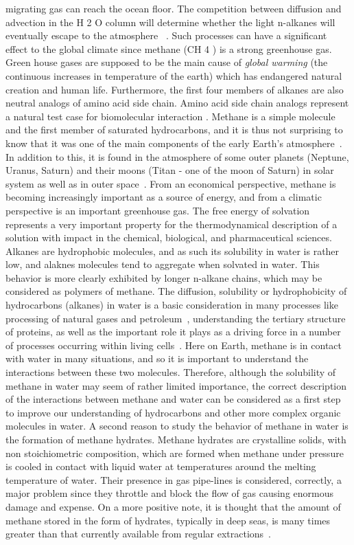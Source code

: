 \begin{sloppypar}
migrating gas can reach the ocean floor. The competition between diffusion and  advection  in the H 2 O column will determine whether the light n-alkanes will eventually escape to the atmosphere ~\citep{mcginnis2006}. Such processes can have a significant effect to the global climate since methane (CH 4 ) is a strong greenhouse gas. Green house gases are supposed to be the main cause of {\it global warming} (the continuous increases in temperature of the earth) which has endangered natural creation and human life. Furthermore, the first four members of alkanes are also neutral analogs of amino acid side chain. Amino acid side chain analogs represent a natural test case for biomolecular interaction \citep{shirts2003,shirts2005solvation}. Methane is a simple molecule and the first member of saturated hydrocarbons, and  it is thus not surprising to know that it was one of the main components of the early Earth's atmosphere~\citep{franks2000}. In addition to this, it is found in the atmosphere of  some outer planets (Neptune, Uranus, Saturn) and their  moons (Titan - one of the moon of Saturn) in solar system as well as in outer space~\citep{Loveday2001a}. From an economical perspective, methane is becoming
increasingly important as a source of energy, and from a climatic perspective is an important greenhouse gas. The free energy of solvation represents a very important property for the thermodynamical description of a solution with impact in the chemical, biological, and pharmaceutical sciences. Alkanes are hydrophobic molecules, and as such its solubility in water is rather low, and alaknes molecules tend to aggregate when solvated in water. This behavior is more clearly exhibited by longer n-alkane
chains, which may be considered as polymers of methane. The diffusion, solubility or hydrophobicity of hydrocarbons (alkanes) in water is a basic consideration in many processes like processing of natural gases and petroleum~\citep{montel1993, kartsev1959}, understanding the tertiary structure of proteins, as well as the important role it plays as a driving force in a number of processes occurring within living cells~\citep{Privalov1988, kyte2006}. Here on Earth, methane is in contact with water
in many situations, and so it is important to understand the interactions between
these two molecules.  Therefore, although the solubility of methane in water may seem of rather limited importance, the correct description of the interactions between methane and water can be considered as a first step to improve our understanding of hydrocarbons and other more complex organic molecules in water. A second reason to study the behavior of methane in water is the formation of methane hydrates. Methane hydrates are crystalline solids, with non stoichiometric composition, which are formed when methane under pressure is cooled in contact with liquid water at temperatures around the melting temperature of water. Their presence in gas pipe-lines is considered, correctly, a major problem since they throttle and block the flow of gas causing enormous damage and expense. On a more positive note, it is thought that the amount of methane stored in the form of hydrates, typically in deep seas, is many times greater than that currently available from regular extractions~\citep{lerche2004, appenzeller1991}. 

\end{sloppypar}
